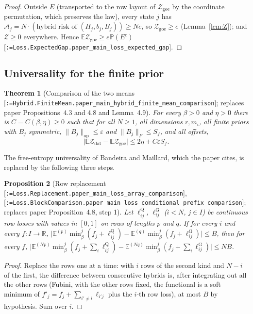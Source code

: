 \documentclass[11pt]{article}
\makeatletter
\newcommand{\formal@break}[1]{\@tfor\formal@tok:=#1\do{%
  \formal@tok
  \expandafter\ifx\formal@tok.\allowbreak\else
  \expandafter\ifx\formal@tok\_\allowbreak\fi\fi}}
\DeclareRobustCommand{\formal}[1]{\textnormal{[\texttt{\small\formal@break{#1}}]}}
\newcommand{\R}{\mathbb{R}}
\newcommand{\E}{\mathbb{E}}
\newcommand{\Prob}{\mathbb{P}}
\newcommand{\norm}[1]{\lVert #1\rVert}
\newcommand{\abs}[1]{\lvert #1\rvert}
\newcommand{\op}{\mathrm{op}}
\newcommand{\Fro}{F}
\theoremstyle{plain}
\newtheorem{theorem}{Theorem}[section]
\newtheorem{proposition}[theorem]{Proposition}
\theoremstyle{definition}
\makeatother
\begin{document}
\begin{proof}
Outside $E$ (transported to the row layout of $\mathcal{Z}_{\mathrm{goe}}$
by the coordinate permutation, which preserves the law), every state $j$
has $\mathcal{A}_j = N\cdot(\text{hybrid risk of }(H_j, b_j, B_j)) \ge Ne$, so
$\mathcal{Z}_{\mathrm{goe}} \ge e$ (Lemma~\ref{lem:Z}); and $\mathcal{Z} \ge 0$
everywhere. Hence $\E\mathcal{Z}_{\mathrm{goe}} \ge e\Prob(E^c)$
\formal{Loss.ExpectedGap.paper\_main\_loss\_expected\_gap}.
\end{proof}

\subsection{Universality for the finite prior}\label{sec:universality}

\begin{theorem}[Comparison of the two means \formal{Hybrid.FiniteMean.paper\_main\_hybrid\_finite\_mean\_comparison}; replaces paper Propositions~4.3 and 4.8 and Lemma~4.9]\label{thm:universality}
For every $\beta > 0$ and $\eta > 0$ there is $C = C(\beta, \eta) \ge 0$ such
that for all $N \ge 1$, all dimensions $r, m_i$, all finite priors with $B_j$
symmetric, $\norm{B_j}_\op \le \varepsilon$ and $\norm{B_j}_\Fro \le S_f$, and all
offsets,
\[
\abs{\E\mathcal{Z}_{\mathrm{dat}} - \E\mathcal{Z}_{\mathrm{goe}}} \le 2\eta + C\varepsilon S_f .
\]
\end{theorem}

The free-entropy universality of Bandeira and Maillard, which the paper
cites, is replaced by the following three steps.

\begin{proposition}[Row replacement \formal{Loss.Replacement.paper\_main\_loss\_array\_comparison}, \formal{Loss.BlockComparison.paper\_main\_loss\_conditional\_prefix\_comparison}; replaces paper Proposition~4.8, step 1]\label{prop:replacement}
Let $\ell^{\mathrm{Q}}_{ij}$, $\ell^{\mathrm{G}}_{ij}$ ($i < N$, $j \in I$) be
continuous row losses with values in $[0,1]$ on rows of lengths $p$ and $q$.
If for every $i$ and every $f : I \to \R$,
$\abs{\E^{(p)}\min_\beta^j(f_j + \ell^{\mathrm{Q}}_{ij}) - \E^{(q)}\min_\beta^j(f_j + \ell^{\mathrm{G}}_{ij})} \le B$,
then for every $f$,
$\abs{\E^{(Np)}\min_\beta^j(f_j + \sum_i\ell^{\mathrm{Q}}_{ij}) - \E^{(Nq)}\min_\beta^j(f_j + \sum_i\ell^{\mathrm{G}}_{ij})} \le NB$.
\end{proposition}

\begin{proof}
Replace the rows one at a time: with $i$ rows of the second kind and $N - i$
of the first, the difference between consecutive hybrids is, after
integrating out all the other rows (Fubini, with the other rows fixed, the
functional is a soft minimum of $f'_j = f_j + \sum_{i'\ne i}\ell_{i'j}$ plus
the $i$-th row loss), at most $B$ by hypothesis. Sum over $i$.
\end{proof}
\end{document}
